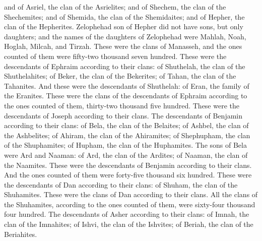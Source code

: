 \begin{biblechapter}
\verse and of Asriel, the clan of the Asrielites; and of Shechem, the clan of the Shechemites;
\verse and of Shemida, the clan of the Shemidaites; and of Hepher, the clan of the Hepherites.
\verse Zelophehad son of Hepher did not have sons, but only daughters; and the names of the daughters of Zelophehad were Mahlah, Noah, Hoglah, Milcah, and Tirzah.
\verse These were the clans of Manasseh, and the ones counted of them were fifty-two thousand seven hundred.
\verse These were the descendants of Ephraim according to their clans: of Shuthelah, the clan of the Shuthelahites; of Beker, the clan of the Bekerites; of Tahan, the clan of the Tahanites.
\verse And these were the descendants of Shuthelah: of Eran, the family of the Eranites.
\verse These were the clans of the descendants of Ephraim according to the ones counted of them, thirty-two thousand five hundred. These were the descendants of Joseph according to their clans.
\verse The descendants of Benjamin according to their clans: of Bela, the clan of the Belaites; of Ashbel, the clan of the Ashbelites; of Ahiram, the clan of the Ahiramites;
\verse of Shephupham, the clan of the Shuphamites; of Hupham, the clan of the Huphamites.
\verse The sons of Bela were Ard and Naaman: of Ard, the clan of the Ardites; of Naaman, the clan of the Naamites.
\verse These were the descendants of Benjamin according to their clans. And the ones counted of them were forty-five thousand six hundred.
\verse These were the descendants of Dan according to their clans: of Shuham, the clan of the Shuhamites. These were the clans of Dan according to their clans.
\verse All the clans of the Shuhamites, according to the ones counted of them, were sixty-four thousand four hundred.
\verse The descendants of Asher according to their clans: of Imnah, the clan of the Imnahites; of Ishvi, the clan of the Ishvites; of Beriah, the clan of the Beriahites.

\end{biblechapter}
